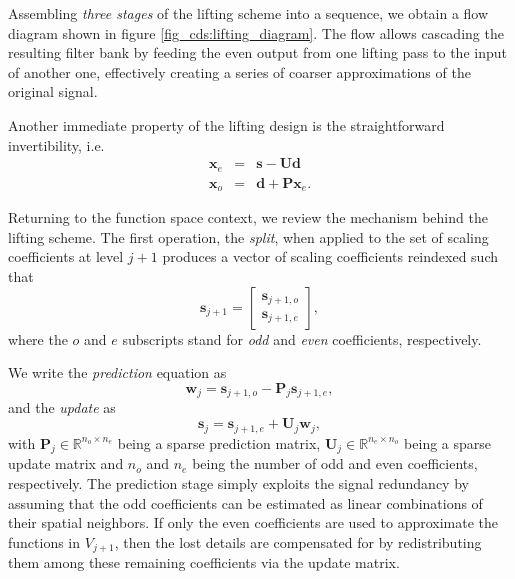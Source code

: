 \documentclass[graybox]{svmult}
\begin{document}
Assembling \emph{three stages} of the lifting scheme into a sequence, we obtain a flow diagram shown in figure \ref{fig_cds:lifting_diagram}. The flow allows cascading the resulting filter bank by feeding the even output from one lifting pass to the input of another one, effectively creating a series of coarser approximations of the original signal.

Another immediate property of the lifting design is the straightforward invertibility, i.e.
\begin{eqnarray}
\mathbf{x}_e &=& \mathbf{s} - \mathbf{Ud} \\
\mathbf{x}_o &=& \mathbf{d} + \mathbf{P}\mathbf{x}_e.
\end{eqnarray}

Returning to the function space context, we review the mechanism behind the lifting scheme. The first operation, the \emph{split}, when applied to the set of scaling coefficients at level $j+1$ produces a vector of scaling coefficients reindexed such that
\begin{equation}
\mathbf{s}_{j+1} = \begin{bmatrix} \mathbf{s}_{j+1,o} \\ \mathbf{s}_{j+1,e} \end{bmatrix},
\label{eq_cds:lifting_splitting}
\end{equation}
where the $o$ and $e$ subscripts stand for \emph{odd} and \emph{even} coefficients, respectively. 

We write the \emph{prediction} equation as
\begin{equation}
\mathbf{w}_j = \mathbf{s}_{j+1,o} - \mathbf{P}_j \mathbf{s}_{j+1,e},
\label{eq_cds:coeff_predict}
\end{equation}
and the \emph{update} as
\begin{equation}
\mathbf{s}_j = \mathbf{s}_{j+1,e} + \mathbf{U}_j \mathbf{w}_j,
\label{eq_cds:coeff_update}
\end{equation}
with $\mathbf{P}_j \in \mathbb{R}^{n_o \times n_e}$ being a sparse prediction matrix, $\mathbf{U}_j \in \mathbb{R}^{n_e \times n_o}$ being a sparse update matrix and $n_o$ and $n_e$ being the number of odd and even coefficients, respectively. The prediction stage simply exploits the signal redundancy by assuming that the odd coefficients can be estimated as linear combinations of their spatial neighbors. If only the even coefficients are used to approximate the functions in $V_{j+1}$, then the lost details are compensated for by redistributing them among these remaining coefficients via the update matrix. 
\end{document}

